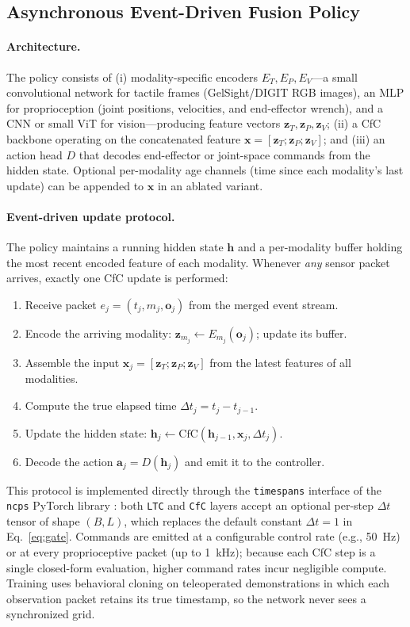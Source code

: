 \documentclass[conference]{IEEEtran}
\begin{document}
\subsection{Asynchronous Event-Driven Fusion Policy}
\paragraph{Architecture.}
The policy consists of (i) modality-specific encoders $E_T, E_P, E_V$---a small convolutional network for tactile frames (GelSight/DIGIT RGB images), an MLP for proprioception (joint positions, velocities, and end-effector wrench), and a CNN or small ViT for vision---producing feature vectors $\mathbf{z}_T, \mathbf{z}_P, \mathbf{z}_V$; (ii) a CfC backbone operating on the concatenated feature $\mathbf{x} = [\mathbf{z}_T; \mathbf{z}_P; \mathbf{z}_V]$; and (iii) an action head $D$ that decodes end-effector or joint-space commands from the hidden state. Optional per-modality age channels (time since each modality's last update) can be appended to $\mathbf{x}$ in an ablated variant.

\paragraph{Event-driven update protocol.}
The policy maintains a running hidden state $\mathbf{h}$ and a per-modality buffer holding the most recent encoded feature of each modality. Whenever \emph{any} sensor packet arrives, exactly one CfC update is performed:
\begin{enumerate}
\item Receive packet $e_j = (t_j, m_j, \mathbf{o}_j)$ from the merged event stream.
\item Encode the arriving modality: $\mathbf{z}_{m_j} \leftarrow E_{m_j}(\mathbf{o}_j)$; update its buffer.
\item Assemble the input $\mathbf{x}_j = [\mathbf{z}_T; \mathbf{z}_P; \mathbf{z}_V]$ from the latest features of all modalities.
\item Compute the true elapsed time $\Delta t_j = t_j - t_{j-1}$.
\item Update the hidden state: $\mathbf{h}_j \leftarrow \mathrm{CfC}(\mathbf{h}_{j-1}, \mathbf{x}_j, \Delta t_j)$.
\item Decode the action $\mathbf{a}_j = D(\mathbf{h}_j)$ and emit it to the controller.
\end{enumerate}
This protocol is implemented directly through the \texttt{timespans} interface of the \texttt{ncps} PyTorch library \cite{lechner_ncps}: both \texttt{LTC} and \texttt{CfC} layers accept an optional per-step $\Delta t$ tensor of shape $(B, L)$, which replaces the default constant $\Delta t = 1$ in Eq.~\eqref{eq:gate}. Commands are emitted at a configurable control rate (e.g., 50~Hz) or at every proprioceptive packet (up to 1~kHz); because each CfC step is a single closed-form evaluation, higher command rates incur negligible compute. Training uses behavioral cloning on teleoperated demonstrations in which each observation packet retains its true timestamp, so the network never sees a synchronized grid.
\end{document}
